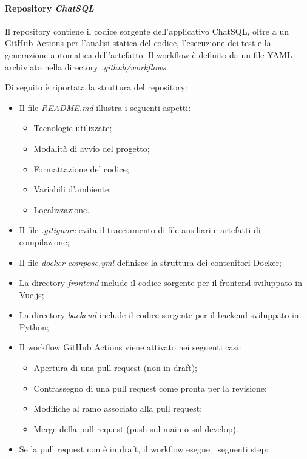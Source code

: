 \paragraph{Repository \emph{ChatSQL}}
Il repository contiene il codice sorgente dell'applicativo ChatSQL, oltre a un  GitHub Actions per l'analisi statica del codice, l'esecuzione dei test e la generazione automatica dell'artefatto. Il workflow è definito da un file YAML archiviato nella directory \emph{.github/workflows}.
\par Di seguito è riportata la struttura del repository:
\begin{itemize}
  \item Il file \emph{README.md} illustra i seguenti aspetti:
  \begin{itemize}
    \item Tecnologie utilizzate;
    \item Modalità di avvio del progetto;
    \item Formattazione del codice;
    \item Variabili d'ambiente;
    \item Localizzazione.
  \end{itemize}
  \item Il file \emph{.gitignore} evita il tracciamento di file ausiliari e artefatti di compilazione;
  \item Il file \emph{docker-compose.yml} definisce la struttura dei contenitori Docker;
  \item La directory \emph{frontend} include il codice sorgente per il frontend sviluppato in Vue.js;
  \item La directory \emph{backend} include il codice sorgente per il backend sviluppato in Python;
  \item Il workflow GitHub Actions viene attivato nei seguenti casi:
  \begin{itemize}
    \item Apertura di una pull request (non in draft);
    \item Contrassegno di una pull request come pronta per la revisione;
    \item Modifiche al ramo associato alla pull request;
    \item Merge della pull request (push sul main o sul develop).
  \end{itemize}
  \item Se la pull request non è in draft, il workflow esegue i seguenti step:
  \begin{itemize}

\end{itemize}
\end{itemize}
